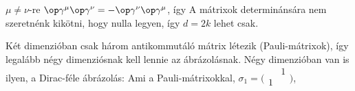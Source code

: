     $\mu\ne\nu$-re $\op\gamma^\mu\op\gamma^\nu=-\op\gamma^\nu\op\gamma^\mu$, így
    A mátrixok determinánsára nem szeretnénk kikötni, hogy nulla legyen, így $d=2k$ lehet csak. 
    
    Két dimenzióban csak három antikommutáló mátrix létezik (Pauli-mátrixok), így legalább négy dimenziósnak kell lennie az ábrázolásnak.
   Négy dimenzióban van is ilyen, a Dirac-féle ábrázolás:
   Ami a Pauli-mátrixokkal, $\sigma_1=\bigl(\begin{smallmatrix}
                                        & 1 \\
                                       1&  \\
                                      \end{smallmatrix}\bigr)$,
